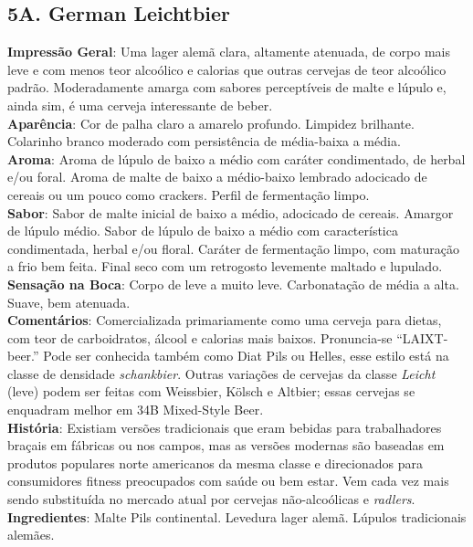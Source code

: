 \subsection*{5A. German Leichtbier}
\textbf{Impressão Geral}: Uma lager alemã clara, altamente atenuada, de corpo mais leve e com menos teor alcoólico e calorias que outras cervejas de teor alcoólico padrão. Moderadamente amarga com sabores perceptíveis de malte e lúpulo e, ainda sim, é uma cerveja interessante de beber. \\
\textbf{Aparência}: Cor de palha claro a amarelo profundo. Limpidez brilhante. Colarinho branco moderado com persistência de média-baixa a média. \\
\textbf{Aroma}: Aroma de lúpulo de baixo a médio com caráter condimentado, de herbal e/ou foral. Aroma de malte de baixo a médio-baixo lembrado adocicado de cereais ou um pouco como crackers. Perfil de fermentação limpo. \\
\textbf{Sabor}: Sabor de malte inicial de baixo a médio, adocicado de cereais. Amargor de lúpulo médio. Sabor de lúpulo de baixo a médio com característica condimentada, herbal e/ou floral. Caráter de fermentação limpo, com maturação a frio bem feita. Final seco com um retrogosto levemente maltado e lupulado. \\
\textbf{Sensação na Boca}: Corpo de leve a muito leve. Carbonatação de média a alta. Suave, bem atenuada. \\
\textbf{Comentários}: Comercializada primariamente como uma cerveja para dietas, com teor de carboidratos, álcool e calorias mais baixos. Pronuncia-se “LAIXT-beer.” Pode ser conhecida também como Diat Pils ou Helles, esse estilo está na classe de densidade \textit{schankbier}. Outras variações de cervejas da classe \textit{Leicht} (leve) podem ser feitas com Weissbier, Kölsch e Altbier; essas cervejas se enquadram melhor em 34B Mixed-Style Beer. \\
\textbf{História}: Existiam versões tradicionais que eram bebidas para trabalhadores braçais em fábricas ou nos campos, mas as versões modernas são baseadas em produtos populares norte americanos da mesma classe e direcionados para consumidores fitness preocupados com saúde ou bem estar. Vem cada vez mais sendo substituída no mercado atual por cervejas não-alcoólicas e \textit{radlers}. \\
\textbf{Ingredientes}: Malte Pils continental. Levedura lager alemã. Lúpulos tradicionais alemães. \\
